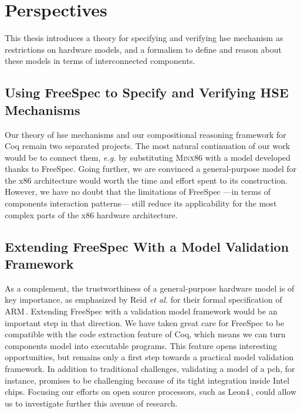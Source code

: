 \section{Perspectives}
\label{sec:conclusion:perspectives}

This thesis introduces a theory for specifying and verifying \ac{hse} mechanism as
restrictions on hardware models, and a formalism to define and reason about
these models in terms of interconnected components.

\subsection*{Using FreeSpec to Specify and Verifying HSE Mechanisms}
%
Our theory of \ac{hse} mechanisms and our compositional reasoning framework for
Coq remain two separated projects.
%
The most natural continuation of our work would be to connect them, \emph{e.g.}
by substituting {\scshape Minx86} with a model developed thanks to FreeSpec.
%
Going further, we are convinced a general-purpose model for the x86 architecture
would worth the time and effort spent to its construction.
%
However, we have no doubt that the limitations of FreeSpec ---in terms of
components interaction patterns--- still reduce its applicability for the most
complex parts of the x86 hardware architecture.

\subsection*{Extending FreeSpec With a Model Validation Framework}
%
As a complement, the trustworthiness of a general-purpose hardware model is of
key importance, as emphasized by Reid \emph{et al.} for their formal
specification of ARM\,\cite{reid2016armv8}.
%
Extending FreeSpec with a validation model framework would be an important step
in that direction.
%
We have taken great care for FreeSpec to be compatible with the code extraction
feature of Coq, which means we can turn components model into executable
programs.
%
This feature opens interesting opportunities, but remains only a first step
towards a practical model validation framework.
%
In addition to traditional challenges, validating a model of a \ac{pch}, for
instance, promises to be challenging because of its tight integration inside
Intel chips.
%
Focusing our efforts on open source processors, such as
Leon4\,\cite{gaisler2007leon}, could allow us to investigate further this avenue
of research.
